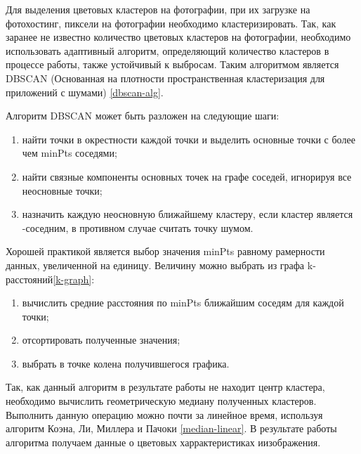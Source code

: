Для выделения цветовых кластеров на фотографии, при их загрузке на фотохостинг, пиксели на фотографии необходимо кластеризировать.
Так, как заранее не известно количество цветовых кластеров на фотографии, необходимо использовать адаптивный алгоритм, определяющий количество кластеров в процессе работы, также устойчивый к выбросам.
Таким алгоритмом является DBSCAN (Основанная на плотности пространственная кластеризация для приложений с шумами) \ref{dbscan-alg}.

Алгоритм DBSCAN может быть разложен на следующие шаги:
\begin{enumerate}
    \item найти точки в \varepsilon окрестности каждой точки и выделить основные точки с более чем minPts соседями;
    \item найти связные компоненты основных точек на графе соседей, игнорируя все неосновные точки;
    \item назначить каждую неосновную ближайшему кластеру, если кластер является \varepsilon -соседним, в противном случае считать точку шумом.
\end{enumerate}

Хорошей практикой является выбор значения minPts равному рамерности данных, увеличенной на единицу.
Величину \varepsilon можно выбрать из графа k-расстояний\ref{k-graph}:
\begin{enumerate}
    \item вычислить средние расстояния по minPts ближайшим соседям для каждой точки;
    \item отсортировать полученные значения;
    \item выбрать \varepsilon в точке колена получившегося графика.
\end{enumerate}

Так, как данный алгоритм в результате работы не находит центр кластера, необходимо вычислить геометрическую медиану полученных кластеров.
Выполнить данную операцию можно почти за линейное время, используя алгоритм Коэна, Ли, Миллера и Пачоки \ref{median-linear}.
В результате работы алгоритма получаем данные о цветовых харрактеристиках иизображения.

\clearpage